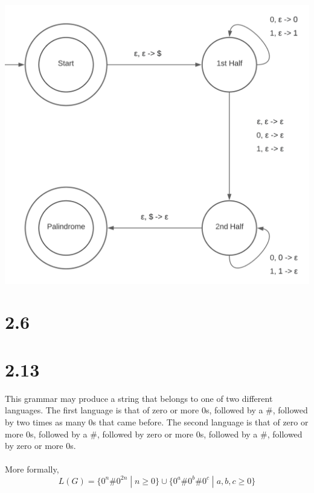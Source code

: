 \documentclass{article}
\begin{document}
\includegraphics[scale=.65]{2.5.b.png}

\section*{2.6}

\section*{2.13}

This grammar may produce a string that belongs to one of two different languages. The first language is that of zero or more $0$s, followed by a $\#$, followed by two times as many $0$s that came before. The second language is that of zero or more $0$s, followed by a $\#$, followed by zero or more $0$s, followed by a $\#$, followed by zero or more $0$s.\\\\
More formally,
$$L(G) = \{ 0^n\#0^{2n} \; | \; n \geq 0 \} \cup  \{ 0^a\#0^b\#0^c \; | \; a,b,c \geq 0 \}$$
\end{document}
